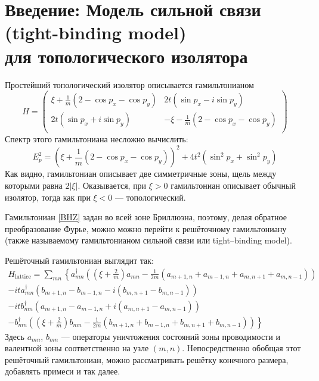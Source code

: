\section{Введение: Модель сильной связи (tight-binding model) \\для топологического изолятора}
Простейший топологический изолятор описывается гамильтонианом \cite{Bernevig2006}
\begin{equation}
    \label{BHZ}
    H = \left(\begin{matrix}
            \xi + \frac{1}{m}(2 - \cos{p_x} - \cos{p_y}) & 2t(\sin{p_x} - i\sin{p_y})   \\
            2t(\sin{p_x} + i\sin{p_y}) & - \xi - \frac{1}{m}(2 - \cos{p_x} - \cos{p_y}) \\
        \end{matrix}\right)
\end{equation}
Спектр этого гамильтониана несложно вычислить:
\begin{equation}
    E_p^2 = (\xi + \frac{1}{m}(2 - \cos{p_x} - \cos{p_y}))^2 + 4t^2(\sin^2{p_x} + \sin^2{p_y})
\end{equation}
Как видно, гамильтониан описывает две симметричные зоны, щель между которыми равна $2|\xi|$. 
Оказывается, при $\xi > 0$ гамильтониан описывает обычный изолятор, тогда как при $\xi < 0$ ---
топологический. 

Гамильтониан \eqref{BHZ} задан во всей зоне Бриллюэна, поэтому, делая обратное 
преобразование Фурье, можно можно перейти к решёточному гамильтониану (также называемому
гамильтонианом сильной связи или tight--binding model).

Решёточный гамильтониан выглядит так:
\begin{multline}
    H_{\mathrm{lattice}} = \sum_{mn} \left\{
        a_{mn}^\dagger\left( \left(\xi + \frac{2}{m}\right) a_{mn}
                 -\frac{1}{2m}(a_{m+1,n} + a_{m-1,n} + a_{m,n+1} + a_{m,n-1})\right)\right. \\
        -it a_{mn}^\dagger(b_{m+1,n} -b_{m-1,n} - i(b_{m,n+1} - b_{m,n-1}))\\
        -it b_{mn}^\dagger(a_{m+1,n} -a_{m-1,n} + i(a_{m,n+1} - a_{m,n-1}))\\
        -\left. b_{mn}^\dagger\left( \left(\xi + \frac{2}{m}\right) b_{mn}
                 -\frac{1}{2m}(b_{m+1,n} + b_{m-1,n} + b_{m,n+1} + b_{m,n-1})\right) \right\}
\end{multline}
Здесь $a_{mn}$, $b_{mn}$ --- операторы уничтожения состояний зоны проводимости и валентной зоны
соответственно на узле $(m,n)$. Непосредственно обобщая этот решёточный гамильтониан, можно
рассматривать решётку конечного размера, добавлять примеси и так далее. 
